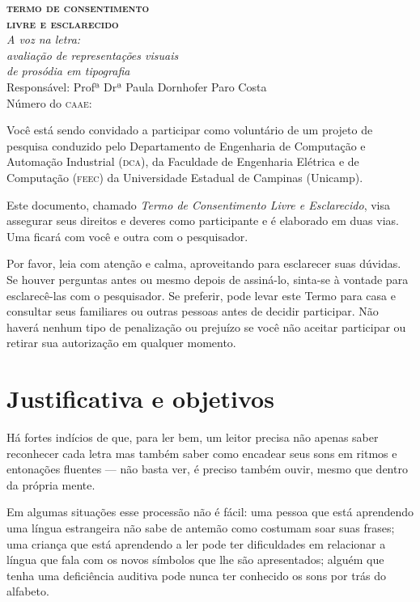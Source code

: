 \documentclass[a4paper,11pt,titlepage,singlespacing]{article}
\begin{document}


	\begin{center}
		\textbf{\Large{\textsc{termo de consentimento \\ livre e esclarecido}}}\\
        \vspace{5pt}
        {\Large\textit{A voz na letra: \\ avaliação de representações visuais \\ de prosódia em tipografia \\ }}
        \vspace{10pt}
        Responsável: Profª Drª Paula Dornhofer Paro Costa\\
        Número do \textsc{caae}: \\
        \vspace{15pt}
	\end{center}

\noindent Você está sendo convidado a participar como voluntário de um projeto de pesquisa conduzido pelo Departamento de Engenharia de Computação e Automação Industrial (\textsc{dca}), da Faculdade de Engenharia Elétrica e de Computação (\textsc{feec}) da Universidade Estadual de Campinas (Unicamp).

Este documento, chamado \textit{Termo de Consentimento Livre e Esclarecido}, visa assegurar seus direitos e deveres como participante e é elaborado em duas vias. Uma ficará com você e outra com o pesquisador.

Por favor, leia com atenção e calma, aproveitando para esclarecer suas dúvidas. Se houver perguntas antes ou mesmo depois de assiná-lo, sinta-se à vontade para esclarecê-las com o pesquisador. Se preferir, pode levar este Termo para casa e consultar seus familiares ou outras pessoas antes de decidir participar. Não haverá nenhum tipo de penalização ou prejuízo se você não aceitar participar ou retirar sua autorização em qualquer momento.


\section*{Justificativa e objetivos}

\noindent Há fortes indícios de que, para ler bem, um leitor precisa não apenas saber reconhecer cada letra mas também saber como encadear seus sons em ritmos e entonações fluentes — não basta ver, é preciso também ouvir, mesmo que dentro da própria mente. 

Em algumas situações esse processão não é fácil: uma pessoa que está aprendendo uma língua estrangeira não sabe de antemão como costumam soar suas frases; uma criança que está aprendendo a ler pode ter dificuldades em relacionar a língua que fala com os novos símbolos que lhe são apresentados; alguém que tenha uma deficiência auditiva pode nunca ter conhecido os sons por trás do alfabeto.
\end{document}
